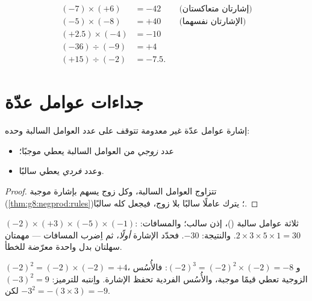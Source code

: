 \begin{example}\label{ex:g8:negprod:products}
\begin{align*}
(-7) \times (+6) &= -42 && \text{(إشارتان متعاكستان)} \\
(-5) \times (-8) &= +40 && \text{(الإشارتان نفسهما)} \\
(+2.5) \times (-4) &= -10 \\
(-36) \div (-9) &= +4 \\
(+15) \div (-2) &= -7.5 .
\end{align*}
\end{example}

\section{جداءات عوامل عدّة}

\begin{proposition}\label{prop:g8:negprod:many}
إشارة  عوامل عدّة غير معدومة تتوقف على عدد
العوامل السالبة وحده:
\begin{itemize}
  \item عدد \emph{زوجي} من العوامل السالبة يعطي 
        موجبًا؛
  \item وعدد \emph{فردي} يعطي  سالبًا.
\end{itemize}
\end{proposition}

\begin{proof}
تتزاوج العوامل السالبة، وكل زوج يسهم بإشارة موجبة
(\cref{thm:g8:negprod:rules})؛  يترك عاملًا سالبًا
بلا زوج، فيجعل  كله سالبًا.
\end{proof}

\begin{example}\label{ex:g8:negprod:many}
$(-2) \times (+3) \times (-5) \times (-1)$: ثلاثة عوامل سالبة
()، إذن  سالب؛ والمسافات: $2 \times 3 \times 5
\times 1 = 30$. والنتيجة: $-30$. فحدّد الإشارة \emph{أولًا}، ثم
اِضرب المسافات --- مهمتان سهلتان بدل واحدة معرّضة
للخطأ.
\end{example}

\begin{example}\label{ex:g8:negprod:powers}
$(-2)^2 = (-2) \times (-2) = +4$، و
$(-2)^3 = (-2)^2 \times (-2) = -8$: فالأُسُس الزوجية تعطي قيمًا
موجبة، والأُسُس الفردية تحفظ الإشارة. واِنتبه للترميز:
$(-3)^2 = 9$ لكن $-3^2 = -(3 \times 3) = -9$.
\end{example}


